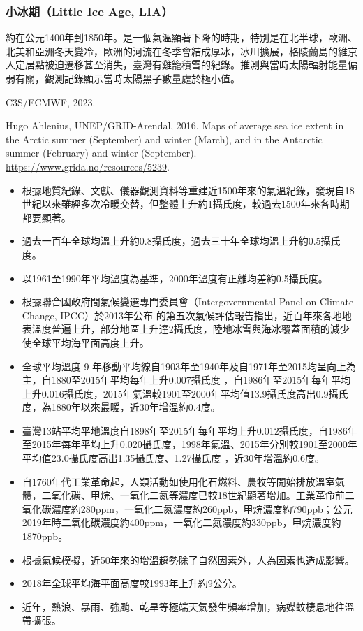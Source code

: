 \documentclass[a4paper,12pt]{report}
\begin{document}
\subsubsection{小冰期（Little Ice Age, LIA）}
約在公元1400年到1850年。是一個氣溫顯著下降的時期，特別是在北半球，歐洲、北美和亞洲冬天變冷，歐洲的河流在冬季會結成厚冰，冰川擴展，格陵蘭島的維京人定居點被迫遷移甚至消失，臺灣有雞籠積雪的紀錄。推測與當時太陽輻射能量偏弱有關，觀測記錄顯示當時太陽黑子數量處於極小值。
\bct\bfH\ctr{}\ef\FB\ect\bct\bfH\ctr{}\ef\FB\ect\bct\bfH\ctr{}\caption{C3S/ECMWF, 2023.}\ef\FB\ect\bct\bfH\ctr{}\ef\FB\ect\bct\bfH\ctr{}\ef\FB\ect\bct\bfH\ctr{}\caption{Hugo Ahlenius, UNEP/GRID-Arendal, 2016. Maps of average sea ice extent in the Arctic summer (September) and winter (March), and in the Antarctic summer (February) and winter (September). \href{https://www.grida.no/resources/5239}{https://www.grida.no/resources/5239}.}\ef\FB\ect
\begin{itemize}
\item 根據地質紀錄、文獻、儀器觀測資料等重建近1500年來的氣溫紀錄，發現自18世紀以來雖經多次冷暖交替，但整體上升約1攝氏度，較過去1500年來各時期都要顯著。
\item 過去一百年全球均溫上升約0.8攝氏度，過去三十年全球均溫上升約0.5攝氏度。
\item 以1961至1990年平均溫度為基準，2000年溫度有正離均差約0.5攝氏度。
\item 根據聯合國政府間氣候變遷專門委員會（Intergovernmental Panel on Climate Change, IPCC）於2013年公布 的第五次氣候評估報告指出，近百年來各地地表溫度普遍上升，部分地區上升達2攝氏度，陸地冰雪與海冰覆蓋面積的減少使全球平均海平面高度上升。
\item 全球平均溫度 9 年移動平均線自1903年至1940年及自1971年至2015均呈向上為主，自1880至2015年平均每年上升0.007攝氏度 ，自1986年至2015年每年平均上升0.016攝氏度，2015年氣溫較1901至2000年平均值13.9攝氏度高出0.9攝氏度，為1880年以來最暖，近30年增溫約0.4度。
\item 臺灣13站平均平地溫度自1898年至2015年每年平均上升0.012攝氏度，自1986年至2015年每年平均上升0.020攝氏度，1998年氣溫、2015年分別較1901至2000年平均值23.0攝氏度高出1.35攝氏度、1.27攝氏度 ，近30年增溫約0.6度。
\item 自1760年代工業革命起，人類活動如使用化石燃料、農牧等開始排放溫室氣體，二氧化碳、甲烷、一氧化二氮等濃度已較18世紀顯著增加。工業革命前二氧化碳濃度約280ppm，一氧化二氮濃度約260ppb，甲烷濃度約790ppb；公元2019年時二氧化碳濃度約400ppm，一氧化二氮濃度約330ppb，甲烷濃度約1870ppb。
\item 根據氣候模擬，近50年來的增溫趨勢除了自然因素外，人為因素也造成影響。
\item 2018年全球平均海平面高度較1993年上升約9公分。
\item 近年，熱浪、暴雨、強颱、乾旱等極端天氣發生頻率增加，病媒蚊棲息地往溫帶擴張。
\end{itemize}
\end{document}
